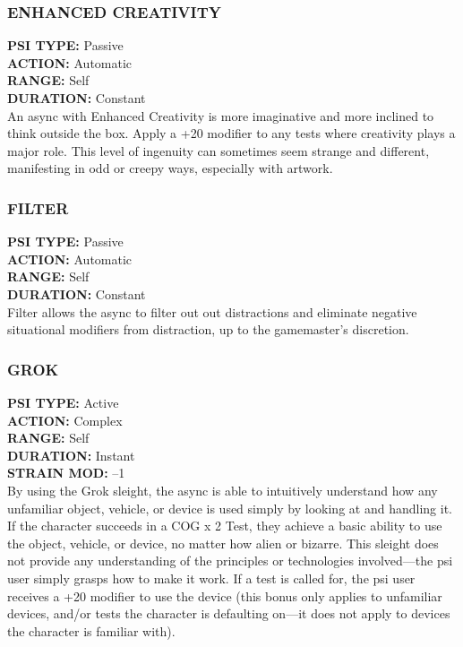 \subsubsection{ENHANCED CREATIVITY}
\textbf{PSI TYPE:} Passive \\ 
\textbf{ACTION:} Automatic \\ 
\textbf{RANGE:} Self \\ 
\textbf{DURATION:} Constant \\
An async with Enhanced Creativity is more imaginative
and more inclined to think outside the box.
Apply a +20 modifier to any tests where creativity
plays a major role. This level of ingenuity can
sometimes seem strange and different, manifesting
in odd or creepy ways, especially with artwork.

\subsubsection{FILTER}
\textbf{PSI TYPE:} Passive \\ 
\textbf{ACTION:} Automatic \\ 
\textbf{RANGE:} Self \\ 
\textbf{DURATION:} Constant \\
Filter allows the async to filter out out distractions
and eliminate negative situational modifiers from
distraction, up to the gamemaster’s discretion.

\subsubsection{GROK}
\textbf{PSI TYPE:} Active \\ 
\textbf{ACTION:} Complex \\ 
\textbf{RANGE:} Self \\ 
\textbf{DURATION:} Instant \\
\textbf{STRAIN MOD:} –1 \\
By using the Grok sleight, the async is able to
intuitively understand how any unfamiliar object,
vehicle, or device is used simply by looking at and
handling it. If the character succeeds in a COG x 2
Test, they achieve a basic ability to use the object,
vehicle, or device, no matter how alien or bizarre.
This sleight does not provide any understanding of
the principles or technologies involved—the psi user
simply grasps how to make it work. If a test is called
for, the psi user receives a +20 modifier to use the
device (this bonus only applies to unfamiliar devices,
and/or tests the character is defaulting on—it does not
apply to devices the character is familiar with).


